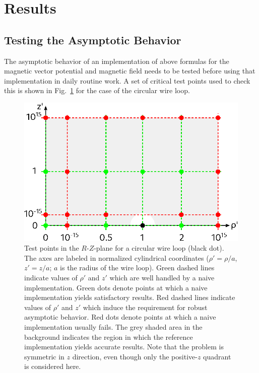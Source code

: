 \section{Results}
\label{sec:results}

\subsection{Testing the Asymptotic Behavior}

The asymptotic behavior of an implementation of above formulas for the magnetic vector potential
and magnetic field needs to be tested before using that implementation in daily routine work.
A set of critical test points used to check this is shown in Fig.~\ref{fig:circularLoop_criticalPoints}
for the case of the circular wire loop.
\begin{figure}[htbp]
 \centering
 \includegraphics{img/circularLoop_criticalPoints.eps}
 \caption{Test points in the $R$-$Z$-plane for a circular wire loop (black dot).
          The axes are labeled in normalized cylindrical coordinates ($\rho' = \rho / a$, $z' = z / a$; $a$ is the radius of the wire loop).
          Green dashed lines indicate values of $\rho'$ and $z'$ which are well handled by a naive implementation.
          Green dots denote points at which a naive implementation yields satisfactory results.
          Red dashed lines indicate values of $\rho'$ and $z'$ which induce the requirement for robust asymptotic behavior.
          Red dots denote points at which a naive implementation usually fails.
          The grey shaded area in the background indicates the region in which the reference implementation yields accurate results.
          Note that the problem is symmetric in $z$ direction, even though only the positive-$z$ quadrant is considered here.}
 \label{fig:circularLoop_criticalPoints}
\end{figure}

